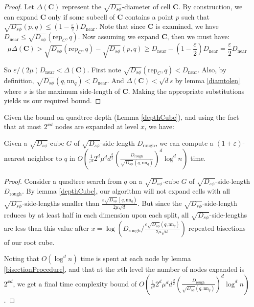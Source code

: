 \documentclass[11pt]{myclass}
\newcommand{\sbreg}{\ensuremath{D_{s\phi}}}
\newcommand{\eps}{\varepsilon}
\begin{document}
\begin{proof}

Let $\Delta(\textbf{C})$ represent the $\sqrt{\sbreg}$-diameter of cell $\textbf{C}$. By construction, 
we can expand $\textbf{C}$ only if some subcell of $\textbf{C}$ contains a point $p$ 
such that $\sqrt{\sbreg}(p , q) \leq (1 - \frac{\eps}{2}) D_{\text{near}}$. Note that since $\textbf{C}$ is 
examined, we have $D_{\text{near}} \leq \sqrt{\sbreg}(\text{rep}_C , q)$. 
Now assuming we expand $\textbf{C}$, then we must have:
\begin{equation}
\mu \Delta(\textbf{C}) > \sqrt{\sbreg}(\text{rep}_C,q) - \sqrt{\sbreg}(p, q) 
\geq D_{\text{near}} - (1 - \frac{\eps}{2})D_{\text{near}} 
= \frac{\eps}{2} D_{\text{near}} \end{equation}

So $\eps/(2 \mu) D_{\text{near}} < \Delta(\textbf{C})$.
First note $\sqrt{\sbreg}(\text{rep}_C, q) < D_{\text{near}} $. Also, by definition,  $\sqrt{\sbreg}(q, \text{nn}_q) < D_{\text{near}}$. And $\Delta(\textbf{C}) < \sqrt{d} s$ by lemma \ref{diamtolen} where $s$ is the maximum side-length of $\textbf{C}$. 
Making the appropriate substitutions yields us our required bound.
\end{proof}

Given the bound on quadtree depth (Lemma \ref{depthCube}), and using the fact that at most $2^{xd}$ nodes are expanded at level $x$, we have:
\begin{lemma}\label{timeFinal}
Given a $\sqrt{\sbreg}$-cube $G$ of $\sqrt{\sbreg}$-side-length $D_{\text{rough}}$, we can compute a $(1 + \eps)$-nearest neighbor to $q$ in $O\left(  \frac{1}{\eps^d} 2^d \mu^d d^{\frac{d}{2}} \left( \frac{D_{\text{rough}}}{\sqrt{\sbreg}(q, \text{nn}_q)} \right)^d  \log^d n \right )$ time.
\end{lemma}

\begin{proof}
Consider a quadtree search from $q$ on a $\sqrt{\sbreg}$-cube $G$ of $\sqrt{\sbreg}$-side-length $D_{\text{rough}}$. By lemma \ref{depthCube}, our algorithm will not 
expand cells with all $\sqrt{\sbreg}$-side-lengths smaller than  $\frac{  \eps \sqrt{\sbreg}(q, \text{nn}_q)}{2 \mu \sqrt{d}}$. But since the $\sqrt{\sbreg}$-side-length reduces by at least half in each dimension upon each split, all $\sqrt{\sbreg}$-side-lengths are less than this value after 
$x =\log \left( D_{\text{rough}}/\frac{  \eps  \sqrt{\sbreg}(q, \text{nn}_q)}{2 \mu \sqrt{d}} \right)$ repeated bisections of our root cube.

Noting that $O(\log^d n)$ time is spent at each node by lemma \ref{bisectionProcedure}, and that at the $x$th level the 
number of nodes expanded is $2^{xd}$, we get a final time complexity bound of 
$O\left( \frac{1}{\eps^d} 2^d \mu^d d^{\frac{d}{2}} \left( \frac{D_{\text{rough}}}{\sqrt{\sbreg}(q, \text{nn}_q)} \right)^d \log^d n \right)$. 
\qedhere
\end{proof}
\end{document}
